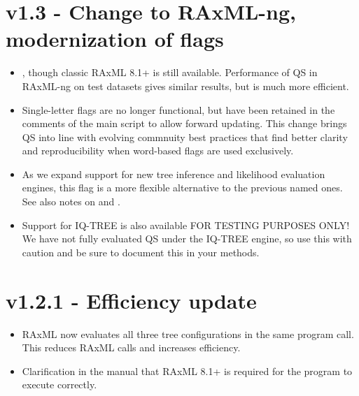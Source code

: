 \documentclass[letterpaper,12pt,english]{sphinxmanual}
\begin{document}
\section{v1.3 - Change to RAxML-ng, modernization of flags}
\label{\detokenize{releases:v1-3-change-to-raxml-ng-modernization-of-flags}}\begin{itemize}
\item {} 
, though classic RAxML 8.1+ is still available.  Performance of QS in RAxML-ng on test datasets gives similar results, but is much more efficient.

\item {} 
 Single-letter flags are no longer functional, but have been retained in the comments of the main  script to allow forward updating.  This change brings QS into line with evolving commnuity best practices that find better clarity and reproducibility when word-based flags are used exclusively.

\item {} 
 As we expand support for new tree inference and likelihood evaluation engines, this flag is a more flexible alternative to the previous named ones.  See also notes on  and .

\item {} 
Support for IQ-TREE is also available FOR TESTING PURPOSES ONLY!  We have not fully evaluated QS under the IQ-TREE engine, so use this with caution and be sure to document this in your methods.

\end{itemize}


\section{v1.2.1 - Efficiency update}
\label{\detokenize{releases:v1-2-1-efficiency-update}}\begin{itemize}
\item {} 
RAxML now evaluates all three tree configurations in the same program call.  This reduces RAxML calls and increases efficiency.

\item {} 
Clarification in the manual that RAxML 8.1+ is required for the program to execute correctly.

\end{itemize}
\end{document}
